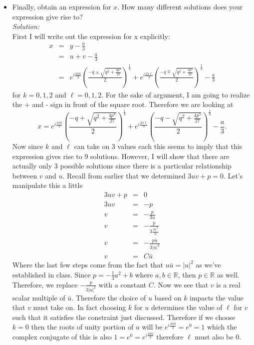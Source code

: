 \documentclass[10pt]{amsart}
\theoremstyle{nonumberplain}
\begin{document}
\begin{enumerate}[label={\bf {\arabic*}:}]
\begin{itemize}
\item Finally, obtain an expression for $x$. How many different solutions does your expression give rise to? \\
\textit{Solution:} \\
First I will write out the expression for x explicitly:
\begin{eqnarray*}
x &=& y -\frac{a}{3} \\
   &=& u + v -\frac{a}{3} \\
   &=& e^{i\frac{2\pi k}{3}}\left(\frac{-q \pm \sqrt{q^2 + \frac{4p^3}{27}}}{2}\right)^{\frac{1}{3}} +
   e^{i\frac{2\pi \ell}{3}} \left(\frac{-q \mp \sqrt{q^2 + \frac{4p^3}{27}}}{2}\right)^{\frac{1}{3}} -\frac{a}{3}
\end{eqnarray*}
for $k = 0, 1, 2$ and $\ell = 0, 1, 2$.
For the sake of argument, I am going to realize the + and - sign in front of the square root.
Therefore we are looking at 
$$ x = e^{i\frac{2\pi k}{3}}\left(\frac{-q + \sqrt{q^2 + \frac{4p^3}{27}}}{2}\right)^{\frac{1}{3}} + e^{i\frac{2\pi \ell}{3}} \left(\frac{-q - \sqrt{q^2 + \frac{4p^3}{27}}}{2}\right)^{\frac{1}{3}} -\frac{a}{3}.$$
Now since $k$ and $\ell$ can take on 3 values each this seems to imply that this expression gives rise to 9 solutions.
However, I will show that there are actually only 3 possible solutions since there is a particular relationship between $v$ and $u$.
Recall from earlier that we determined $3uv+p=0$.
Let's manipulate this a little
\begin{eqnarray*}
3uv+p &=& 0 \\
3uv &=& -p \\
v &=& -\frac{p}{3u} \\
v &=& -\frac{p}{3\frac{|u|^2}{\bar{u}}} \\
v &=& -\frac{p \bar{u}}{3|u|^2} \\
v &=& C\bar{u}
\end{eqnarray*}
Where the last few steps come from the fact that $u\bar{u} = |u|^2$ as we've established in class.
Since $p = -\frac{1}{3}a^2 + b$ where $a, b \in \mathbb{R}$, then $p \in \mathbb{R}$ as well.
Therefore, we replace $-\frac{p }{3|u|^2}$ with a constant $C$.
Now we see that $v$ is a real scalar multiple of $\bar{u}$.
Therefore the choice of $u$ based on $k$ impacts the value that $v$ must take on.
In fact choosing $k$ for $u$ determines the value of $\ell$ for $v$ such that it satisfies the constraint just discussed.
Therefore if we choose $k=0$ then the roots of unity portion of $u$ will be $e^{i\frac{2\pi 0}{3}} = e^0 = 1$ which the complex conjugate of this is also $1 = e^0 = e^{i\frac{2\pi 0}{3}}$ therefore $\ell$ must also be 0.

\end{itemize}
\end{enumerate}
\end{document}
